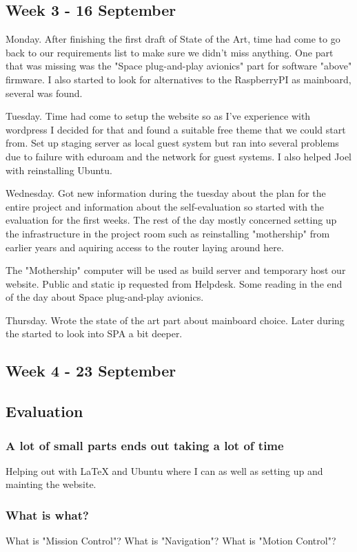 \subsection{Week 3 - 16 September}\label{week_3}
Monday. After finishing the first draft of State of the Art, time
had come to go back to our requirements list to make sure we didn't miss
anything. One part that was missing was the "Space plug-and-play avionics"
part for software "above" firmware. I also started to look for alternatives
to the RaspberryPI as mainboard, several was found.

Tuesday. Time had come to setup the website so as I've experience with
wordpress I decided for that and found a suitable free theme that we could
start from. Set up staging server as local guest system but ran into several
problems due to failure with eduroam and the network for guest systems. I also
helped Joel with reinstalling Ubuntu.

Wednesday. Got new information during the tuesday about the plan for the entire
project and information about the self-evaluation so started with the
evaluation for the first weeks. The rest of the day mostly concerned setting
up the infrastructure in the project room such as reinstalling "mothership"
from earlier years and aquiring access to the router laying around here.

The "Mothership" computer will be used as build server and temporary host
our website. Public and static ip requested from Helpdesk. Some reading
in the end of the day about Space plug-and-play avionics.

Thursday. Wrote the state of the art part about mainboard choice.
Later during the started to look into SPA a bit deeper.

\subsection{Week 4 - 23 September}\label{week_4}
\subsection{Evaluation}\label{first_period_evaluation}
\subsubsection{A lot of small parts ends out taking a lot of time}
Helping out with LaTeX and Ubuntu where I can as well as setting up and
mainting the website.

\subsubsection{What is what?}
What is "Mission Control"? What is "Navigation"? What is "Motion Control"?
